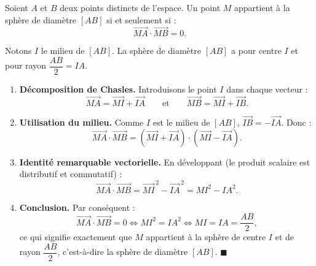 \documentclass[11pt]{article}
\begin{document}
\begin{propriete}
Soient $A$ et $B$ deux points distincts de l'espace. Un point $M$ appartient à la sphère de diamètre $[AB]$ si et seulement si :
\[ \overrightarrow{MA}\cdot\overrightarrow{MB} = 0. \]
\end{propriete}

\begin{experience}
Notons $I$ le milieu de $[AB]$. La sphère de diamètre $[AB]$ a pour centre $I$ et pour rayon $\dfrac{AB}{2} = IA$.
\begin{enumerate}
  \item \textbf{Décomposition de Chasles.} Introduisons le point $I$ dans chaque vecteur :
  \[ \overrightarrow{MA} = \overrightarrow{MI}+\overrightarrow{IA} \qquad\text{et}\qquad \overrightarrow{MB} = \overrightarrow{MI}+\overrightarrow{IB}. \]
  \item \textbf{Utilisation du milieu.} Comme $I$ est le milieu de $[AB]$, $\overrightarrow{IB} = -\overrightarrow{IA}$. Donc :
  \[ \overrightarrow{MA}\cdot\overrightarrow{MB} = \left(\overrightarrow{MI}+\overrightarrow{IA}\right)\cdot\left(\overrightarrow{MI}-\overrightarrow{IA}\right). \]
  \item \textbf{Identité remarquable vectorielle.} En développant (le produit scalaire est distributif et commutatif) :
  \[ \overrightarrow{MA}\cdot\overrightarrow{MB} = \overrightarrow{MI}^{\,2} - \overrightarrow{IA}^{\,2} = MI^2 - IA^2. \]
  \item \textbf{Conclusion.} Par conséquent :
  \[ \overrightarrow{MA}\cdot\overrightarrow{MB}=0 \iff MI^2 = IA^2 \iff MI = IA = \frac{AB}{2}, \]
  ce qui signifie exactement que $M$ appartient à la sphère de centre $I$ et de rayon $\dfrac{AB}{2}$, c'est-à-dire la sphère de diamètre $[AB]$. $\blacksquare$
\end{enumerate}
\end{experience}
\end{document}
